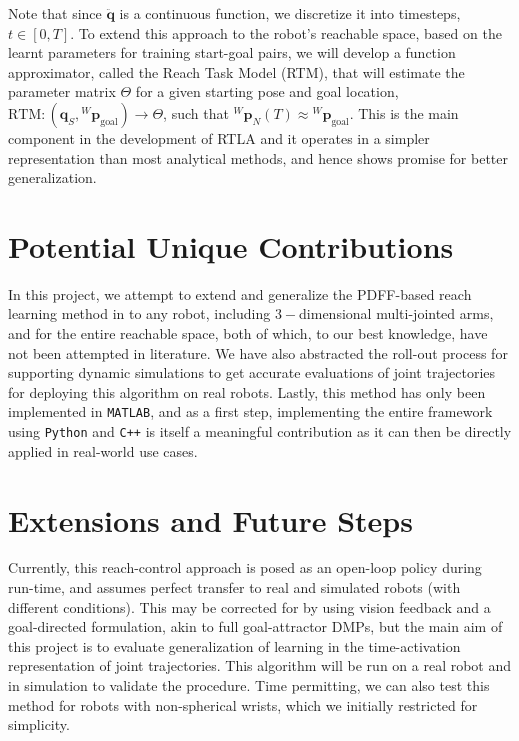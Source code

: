\documentclass[10pt]{article}
\begin{document}
Note that since $\ddot{\mathbf{q}}$ is a continuous function, we discretize it into timesteps, $t \in [0, T]$. To extend this approach to the robot's reachable space, based on the learnt parameters for training start-goal pairs, we will develop a function approximator, called the Reach Task Model (RTM), that will estimate the parameter matrix $\Theta$ for a given starting pose and goal location, $\text{RTM}: (\mathbf{q}_S, {^W}\mathbf{p}_{\text{goal}}) \rightarrow \Theta$, such that ${^W}\mathbf{p}_{N}(T) \approx {^W}\mathbf{p}_{\text{goal}}$. This is the main component in the development of RTLA and it operates in a simpler representation than most analytical methods, and hence shows promise for better generalization.

\section{Potential Unique Contributions}
In this project, we attempt to extend and generalize the PDFF-based reach learning method in \cite{pdff} to any robot, including $3-$dimensional multi-jointed arms, and for the entire reachable space, both of which, to our best knowledge, have not been attempted in literature. We have also abstracted the roll-out process for supporting dynamic simulations to get accurate evaluations of joint trajectories for deploying this algorithm on real robots. Lastly, this method has only been implemented in \texttt{MATLAB}, and as a first step, implementing the entire framework using \texttt{Python} and \texttt{C++} is itself a meaningful contribution as it can then be directly applied in real-world use cases.

\section{Extensions and Future Steps}
Currently, this reach-control approach is posed as an open-loop policy during run-time, and assumes perfect transfer to real and simulated robots (with different conditions). This may be corrected for by using vision feedback and a goal-directed formulation, akin to full goal-attractor DMPs, but the main aim of this project is to evaluate generalization of learning in the time-activation representation of joint trajectories. This algorithm will be run on a real robot and in simulation to validate the procedure. Time permitting, we can also test this method for robots with non-spherical wrists, which we initially restricted for simplicity.
\end{document}
